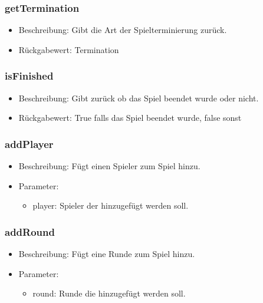 \documentclass[a4paper]{scrreprt}
\begin{document}
    \subsubsection{getTermination}
    \begin{itemize}
        \item Beschreibung: Gibt die Art der Spielterminierung zurück.
        \item Rückgabewert: Termination
    \end{itemize}

    \subsubsection{isFinished}
    \begin{itemize}
        \item Beschreibung: Gibt zurück ob das Spiel beendet wurde oder nicht.
        \item Rückgabewert: True falls das Spiel beendet wurde, false sonst
    \end{itemize}

    \subsubsection{addPlayer}
    \begin{itemize}
        \item Beschreibung: Fügt einen Spieler zum Spiel hinzu.
        \item Parameter:
        \begin{itemize}
            \item player: Spieler der hinzugefügt werden soll.
        \end{itemize}
    \end{itemize}

    \subsubsection{addRound}
    \begin{itemize}
        \item Beschreibung: Fügt eine Runde zum Spiel hinzu.
        \item Parameter:
        \begin{itemize}
            \item round: Runde die hinzugefügt werden soll.
        \end{itemize}
    \end{itemize}
\end{document}
